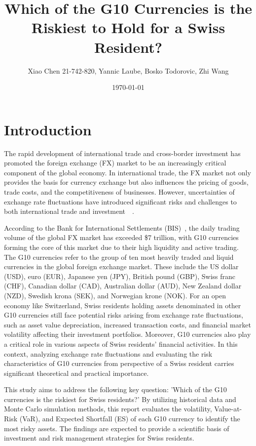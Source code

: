 \documentclass[a4paper, 12pt]{article}
\title{\textbf{Which of the G10 Currencies is the Riskiest to Hold for a Swiss Resident?}}
\author{Xiao Chen 21-742-820, Yannic Laube, Bosko Todorovic, Zhi Wang}
\date{\today}
\begin{document}
\maketitle
\section{Introduction}
The rapid development of international trade and cross-border investment has promoted the foreign exchange (FX) market to be an increasingly critical component of the global economy. In international trade, the FX market not only provides the basis for currency exchange but also influences the pricing of goods, trade costs, and the competitiveness of businesses. However, uncertainties of exchange rate fluctuations have introduced significant risks and challenges to both international trade and investment~\cite{AUBOIN_RUTA_2013}~\cite{riker2020review}.

According to the Bank for International Settlements (BIS)~\cite{bis2022report}, the daily trading volume of the global FX market has exceeded \$7 trillion, with G10 currencies forming the core of this market due to their high liquidity and active trading. The G10 currencies refer to the group of ten most heavily traded and liquid currencies in the global foreign exchange market. These include the US dollar (USD), euro (EUR), Japanese yen (JPY), British pound (GBP), Swiss franc (CHF), Canadian dollar (CAD), Australian dollar (AUD), New Zealand dollar (NZD), Swedish krona (SEK), and Norwegian krone (NOK). For an open economy like Switzerland, Swiss residents holding assets denominated in other G10 currencies still face potential risks arising from exchange rate fluctuations, such as asset value depreciation, increased transaction costs, and financial market volatility affecting their investment portfolios. Moreover, G10 currencies also play a critical role in various aspects of Swiss residents' financial activities. In this context, analyzing exchange rate fluctuations and evaluating the risk characteristics of G10 currencies from perspective of a Swiss resident carries significant theoretical and practical importance.

This study aims to address the following key question: 'Which of the G10 currencies is the riskiest for Swiss residents?' By utilizing historical data and Monte Carlo simulation methods, this report evaluates the volatility, Value-at-Risk (VaR), and Expected Shortfall (ES) of each G10 currency to identify the most risky assets. The findings are expected to provide a scientific basis of investment and risk management strategies for Swiss residents.
\end{document}
